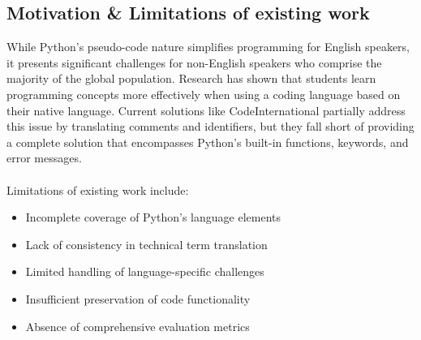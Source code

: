 \documentclass[11pt,a4paper]{article}
\begin{document}
            \subsection{Motivation \& Limitations of existing work} 
            While Python's pseudo-code nature simplifies programming for English speakers, it presents significant challenges for non-English speakers who comprise the majority of the global population. Research has shown that students learn programming concepts more effectively when using a coding language based on their native language. Current solutions like CodeInternational partially address this issue by translating comments and identifiers, but they fall short of providing a complete solution that encompasses Python's built-in functions, keywords, and error messages.\\ \\ 
            Limitations of existing work include:
            \begin{itemize}[itemsep=0pt, topsep=0pt]
                \item Incomplete coverage of Python's language elements
                \item Lack of consistency in technical term translation
                \item Limited handling of language-specific challenges
                \item Insufficient preservation of code functionality
                \item Absence of comprehensive evaluation metrics
            \end{itemize} 
\end{document}
